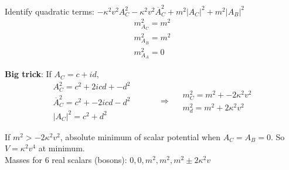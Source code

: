 \documentclass[twoside]{amsart}
\begin{document}
\begin{enumerate}
Identify quadratic terms: $- \kappa^2 v^2 A_C^2 - \kappa^2 v^2 \overline{A}_C^2 + m^2 |A_C|^2 + m^2 |A_B|^2$
\[
\begin{aligned}
  m_{A_C}^2 = m^2 \\ 
  m_{A_B}^2 = m^2 \\ 
  m_{A_A}^2 = 0 
\end{aligned}
\]

\textbf{Big trick}: If $A_C = c+id$, 
\[
\begin{aligned}
  A_C^2 = c^2 + 2i cd + - d^2 \\ 
  \overline{A}_C^2 = c^2 + - 2icd - d^2 \\ 
  |A_C|^2 = c^2 + d^2 
\end{aligned} \quad \quad \quad \Longrightarrow \quad \begin{aligned} m^2_C = m^2 + - 2\kappa^2 v^2 \\ m^2_d = m^2 + 2\kappa^2 v^2 \end{aligned}
\]

If $m^2 > -2\kappa^2 v^2$, absolute minimum of scalar potential when $A_C = A_B = 0$.  So $V = \kappa^2 v^4$ at minimum.   \\

Masses for 6 real scalars (bosons): $0,0, m^2, m^2, m^2 \pm 2\kappa^2 v$  



\end{enumerate}
\end{document}
